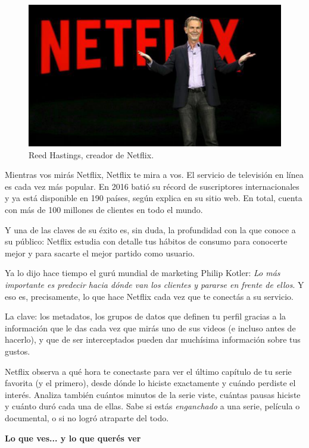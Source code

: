 \documentclass[a4paper,10pt,twoside,final,spanish]{article}
\begin{document}
\begin{figure}[!htbp]
\centerline{\includegraphics{img1}}
\caption{Reed Hastings, creador de Netflix.}
\label{fig:img1}
\end{figure}
 
Mientras vos mirás Netflix, Netflix te mira a vos. El servicio de televisión en 
línea es cada vez más popular. En 2016 batió su récord de suscriptores 
internacionales y ya está disponible en 190 países, según explica en su sitio 
web. En total, cuenta con más de 100 millones de clientes en todo el 
mundo.

Y una de las claves de su éxito es, sin duda, la profundidad con la que 
conoce a su público: Netflix estudia con detalle tus hábitos de consumo 
para conocerte mejor y para sacarte el mejor partido como usuario.
 
Ya lo dijo hace tiempo el gurú mundial de marketing Philip Kotler: \textit{Lo más importante es predecir hacia dónde van los clientes y pararse en frente de ellos}. Y eso es, precisamente, lo que hace Netflix cada vez que te conectás a su servicio.
 
La clave: los metadatos, los grupos de datos que definen tu perfil gracias a la información que le das cada vez que mirás uno de sus videos (e incluso antes de hacerlo), y que de ser interceptados pueden dar muchísima información sobre tus gustos.

Netflix observa a qué hora te conectaste para ver el último capítulo de tu serie favorita (y el primero), desde dónde lo hiciste exactamente y cuándo perdiste el interés. Analiza también cuántos minutos de la serie viste, cuántas pausas hiciste y cuánto duró cada una de ellas. Sabe si estás \textit{enganchado} a una serie, película o documental, o si no logró atraparte del todo.

\textbf{Lo que ves... y lo que querés ver}
 
\end{document}
